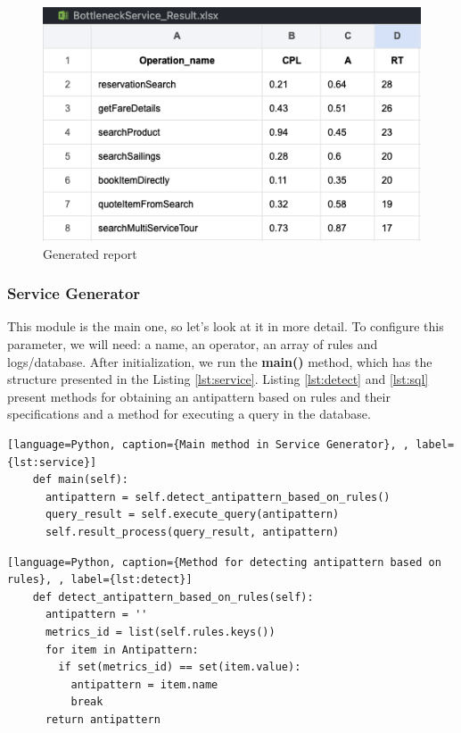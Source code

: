 \documentclass[12pt, times]{article}
\begin{document}
	\begin{figure}[h]
		\centering
		\includegraphics[scale=0.6]{res1}
		\caption{Generated report}
		\label{fig:res1}
	\end{figure}	
	
	
	\subsubsection{Service Generator}
	
	\hspace*{5mm} This module is the main one, so let's look at it in more detail. To configure this parameter, we will need: a name, an operator, an array of rules and logs/database. After initialization, we run the \textbf{main()} method, which has the structure presented in the Listing \ref{lst:service}. Listing \ref{lst:detect} and \ref{lst:sql} present methods for obtaining an antipattern based on rules and their specifications and a method for executing a query in the database.
	
	\begin{lstlisting}[language=Python, caption={Main method in Service Generator}, , label={lst:service}]
	def main(self):
	  antipattern = self.detect_antipattern_based_on_rules()
	  query_result = self.execute_query(antipattern)
	  self.result_process(query_result, antipattern)
	\end{lstlisting}

	\begin{lstlisting}[language=Python, caption={Method for detecting antipattern based on rules}, , label={lst:detect}]
	def detect_antipattern_based_on_rules(self):
	  antipattern = ''
	  metrics_id = list(self.rules.keys())
	  for item in Antipattern:
	    if set(metrics_id) == set(item.value):
		  antipattern = item.name
		  break
	  return antipattern
	\end{lstlisting}
\end{document}
